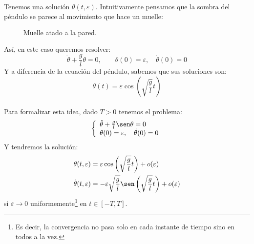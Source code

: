Tenemos una solución $\theta(t,\varepsilon)$. Intuitivamente pensamos que la sombra del péndulo se parece al movimiento que hace un muelle:
\begin{figure}[H]
    \centering
\caption{Muelle atado a la pared.}
\label{fig:muelle}
\end{figure}
\noindent
Así, en este caso queremos resolver:
\begin{equation*}
    \ddot{\theta} + \frac{g}{l}\theta = 0, \qquad \theta(0) = \varepsilon,\quad \dot{\theta}(0) = 0
\end{equation*}
Y a diferencia de la ecuación del péndulo, sabemos que sus soluciones son:
\begin{equation*}
    \theta(t) = \varepsilon\cos\left(\sqrt{\frac{g}{l}}t\right)
\end{equation*}~\\

\noindent
Para formalizar esta idea, dado $T>0$ tenemos el problema:
\begin{equation*}
    \left\{\begin{array}{l}
        \ddot{\theta} + \frac{g}{l}\sen\theta = 0 \\
        \theta(0) = \varepsilon,\quad \dot{\theta}(0) = 0
    \end{array}\right.
\end{equation*}
Y tendremos la solución:
\begin{align*}
    \theta(t,\varepsilon) &= \varepsilon \cos\left(\sqrt{\frac{g}{l}}t\right) + o(\varepsilon) \\
    \dot{\theta}(t,\varepsilon) &= -\varepsilon \sqrt{\frac{g}{l}}\sen\left(\sqrt{\frac{g}{l}}t\right) + o(\varepsilon)
\end{align*}
si $\varepsilon\to 0$ uniformemente\footnote{Es decir, la convergencia no pasa solo en cada instante de tiempo sino en todos a la vez.} en $t\in [-T,T]$.\\

